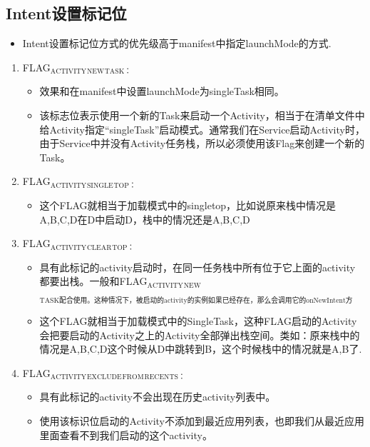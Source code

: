 \documentclass[9pt, b5paaper]{book}
\begin{document}
\subsection{Intent设置标记位}
\label{sec-4-6-2}
\begin{itemize}
\item Intent设置标记位方式的优先级高于manifest中指定launchMode的方式.
\end{itemize}
\begin{enumerate}
\item FLAG$_{\text{ACTIVITY}}$$_{\text{NEW}}$$_{\text{TASK：}}$
\label{sec-4-6-2-1}
\begin{itemize}
\item 效果和在manifest中设置launchMode为singleTask相同。
\item 该标志位表示使用一个新的Task来启动一个Activity，相当于在清单文件中给Activity指定“singleTask”启动模式。通常我们在Service启动Activity时，由于Service中并没有Activity任务栈，所以必须使用该Flag来创建一个新的Task。
\end{itemize}
\item FLAG$_{\text{ACTIVITY}}$$_{\text{SINGLE}}$$_{\text{TOP：}}$
\label{sec-4-6-2-2}
\begin{itemize}
\item 这个FLAG就相当于加载模式中的singletop，比如说原来栈中情况是A,B,C,D在D中启动D，栈中的情况还是A,B,C,D
\end{itemize}
\item FLAG$_{\text{ACTIVITY}}$$_{\text{CLEAR}}$$_{\text{TOP：}}$
\label{sec-4-6-2-3}
\begin{itemize}
\item 具有此标记的activity启动时，在同一任务栈中所有位于它上面的activity都要出栈。一般和FLAG$_{\text{ACTIVITY}}$$_{\text{NEW}}$$_{\text{TASK配合使用。这种情况下，被启动的activity的实例如果已经存在，那么会调用它的onNewIntent方法。}}$
\item 这个FLAG就相当于加载模式中的SingleTask，这种FLAG启动的Activity会把要启动的Activity之上的Activity全部弹出栈空间。类如：原来栈中的情况是A,B,C,D这个时候从D中跳转到B，这个时候栈中的情况就是A,B了.
\end{itemize}
\item FLAG$_{\text{ACTIVITY}}$$_{\text{EXCLUDE}}$$_{\text{FROM}}$$_{\text{RECENTS：}}$
\label{sec-4-6-2-4}
\begin{itemize}
\item 具有此标记的activity不会出现在历史activity列表中。
\item 使用该标识位启动的Activity不添加到最近应用列表，也即我们从最近应用里面查看不到我们启动的这个activity。

\end{itemize}$$
\end{enumerate}
\end{document}
